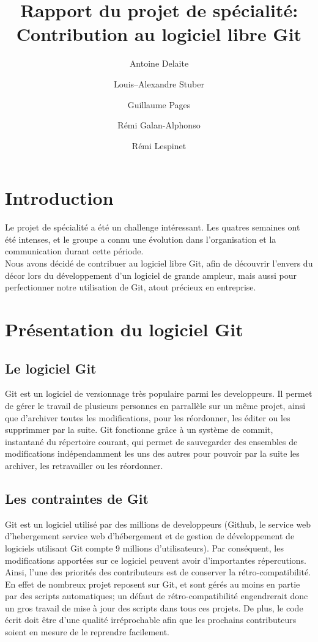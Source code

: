 \documentclass[a4paper, 12pt]{article}
\title{Rapport du projet de spécialité:\\ Contribution au logiciel libre Git}
\author{Antoine Delaite \and Louis--Alexandre Stuber \and Guillaume Pages \and Rémi Galan-Alphonso \and Rémi Lespinet}
\date{}
\begin{document}
\maketitle

\section{Introduction}

Le projet de spécialité a été un challenge intéressant. Les quatres semaines ont été intenses, et le groupe a connu une évolution dans l'organisation et la communication durant cette période.\\

Nous avons décidé de contribuer au logiciel libre Git, afin de découvrir l'envers du décor lors du développement d'un logiciel de grande ampleur, mais aussi pour perfectionner notre utilisation de Git, atout précieux en entreprise.

\section{Présentation du logiciel Git}

\subsection{Le logiciel Git}

Git est un logiciel de versionnage très populaire parmi les developpeurs.
Il permet de gérer le travail de plusieurs personnes en parrallèle sur un même projet, ainsi que d'archiver toutes les modifications, pour les réordonner, les éditer ou les supprimmer par la suite.
Git fonctionne grâce à un système de commit, instantané du répertoire courant, qui permet de sauvegarder des ensembles de modifications indépendamment les uns des autres pour pouvoir par la suite les archiver, les retravailler ou les réordonner.

\subsection{Les contraintes de Git}

Git est un logiciel utilisé par des millions de developpeurs (Github, le service web d'hebergement service web d'hébergement et de gestion de développement de logiciels utilisant Git compte 9 millions d'utilisateurs).
Par conséquent, les modifications apportées sur ce logiciel peuvent avoir d'importantes répercutions.
Ainsi, l'une des priorités des contributeurs est de conserver la rétro-compatibilité.
En effet de nombreux projet reposent sur Git, et sont gérés au moins en partie par des scripts automatiques; un défaut de rétro-compatibilité engendrerait donc un gros travail de mise à jour des scripts dans tous ces projets. 
De plus, le code écrit doit être d'une qualité irréprochable afin que les prochains contributeurs soient en mesure de le reprendre facilement.
\end{document}
